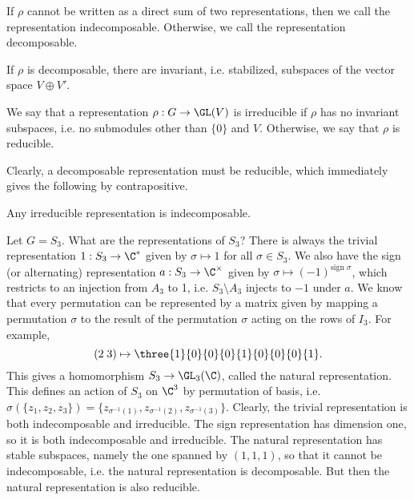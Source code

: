 
\begin{dfn}[Indecomposable]
If $\rho$ cannot be written as a direct sum of two representations, then we call the representation indecomposable. Otherwise, we call the representation decomposable. 
\end{dfn}


If $\rho$ is decomposable, there are invariant, i.e. stabilized, subspaces of the vector space $V \oplus V'$. 


\begin{dfn}[Irreducible]
We say that a representation $\rho: G \to \GL(V)$ is irreducible if $\rho$ has no invariant subspaces, i.e. no submodules other than $\{0\}$ and $V$. Otherwise, we say that $\rho$ is reducible.
\end{dfn}


Clearly, a decomposable representation must be reducible, which immediately gives the following by contrapositive. 

\begin{thm}
Any irreducible representation is indecomposable. 
\end{thm}


\begin{ex}
Let $G=S_3$. What are the representations of $S_3$? There is always the trivial representation $1: S_3 \to \C^*$ given by $\sigma \mapsto 1$ for all $\sigma \in S_3$. We also have the sign (or alternating) representation $a: S_3 \to \C^\times$ given by $\sigma \mapsto (-1)^{\text{sign }\sigma}$, which restricts to an injection from $A_3$ to 1, i.e. $S_3 \setminus A_3$ injects to $-1$ under $a$. We know that every permutation can be represented by a matrix given by mapping a permutation $\sigma$ to the result of the permutation $\sigma$ acting on the rows of $I_3$. For example,
	\[
	(2\;3) \mapsto \three{1}{0}{0}{0}{1}{0}{0}{0}{1}.
	\]
This gives a homomorphism $S_3 \to \GL_3(\C)$, called the natural representation. This defines an action of $S_3$ on $\C^3$ by permutation of basis, i.e. $\sigma(\{z_1,z_2,z_3\})= \{z_{\sigma^{-1}(1)}, z_{\sigma^{-1}(2)}, z_{\sigma^{-1}(3)}\}$. Clearly, the trivial representation is both indecomposable and irreducible. The sign representation has dimension one, so it is both indecomposable and irreducible. The natural representation has stable subspaces, namely the one spanned by $(1,1,1)$, so that it cannot be indecomposable, i.e. the natural representation is decomposable. But then the natural representation is also reducible.
\end{ex}


